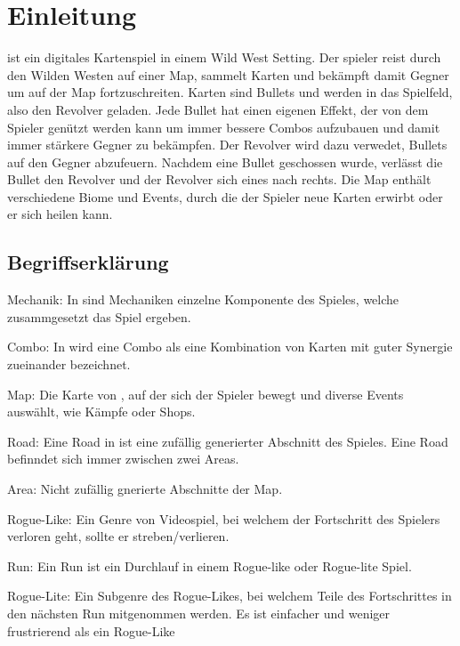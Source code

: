 
\section{Einleitung}\label{sec:einleitung}

\renewcommand{\kapitelautor}{Autor: Philip Jankovic}


\FF ist ein digitales Kartenspiel in einem Wild West Setting. Der spieler reist durch den Wilden Westen auf einer Map,
sammelt Karten und bekämpft damit Gegner um auf der Map fortzuschreiten. Karten sind Bullets und werden in das Spielfeld, also den Revolver geladen.
Jede Bullet hat einen eigenen Effekt, der von dem Spieler genützt werden kann um immer bessere Combos aufzubauen und damit immer stärkere Gegner zu bekämpfen.
Der Revolver wird dazu verwedet, Bullets auf den Gegner abzufeuern. Nachdem eine Bullet geschossen wurde, verlässt die
Bullet den Revolver und der Revolver sich eines nach rechts.
Die Map enthält verschiedene Biome und Events, durch die der Spieler neue Karten erwirbt oder er sich heilen kann.



\subsection{Begriffserklärung}\label{begriffserklärung}
Mechanik: In \FF sind Mechaniken einzelne Komponente des Spieles, welche zusammgesetzt das Spiel ergeben.

Combo: In \FF wird eine Combo als eine Kombination von Karten mit guter Synergie zueinander bezeichnet.


Map: Die Karte von \FF, auf der sich der Spieler bewegt und diverse Events auswählt, wie \zB Kämpfe oder Shops.

Road: Eine Road in \FF ist eine zufällig generierter Abschnitt des Spieles. Eine Road befinndet sich immer zwischen zwei Areas.

Area: Nicht zufällig gnerierte Abschnitte der \FF Map.

Rogue-Like: Ein Genre von Videospiel, bei welchem der Fortschritt des Spielers verloren geht, sollte er streben/verlieren.

Run: Ein Run ist ein Durchlauf in einem Rogue-like oder Rogue-lite Spiel. 

Rogue-Lite: Ein Subgenre des Rogue-Likes, bei welchem Teile des Fortschrittes in den nächsten Run mitgenommen werden.
Es ist einfacher und weniger frustrierend als ein Rogue-Like

%

\renewcommand{\kapitelautor}{}
